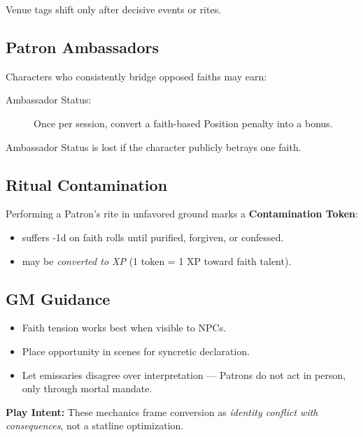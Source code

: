 \documentclass[11pt]{article}
\begin{document}
Venue tags shift only after decisive events or rites.

\subsection{Patron Ambassadors}

Characters who consistently bridge opposed faiths may earn:

\begin{description}
  \item[Ambassador Status:] Once per session, convert a faith-based
  Position penalty into a bonus.
\end{description}

Ambassador Status is lost if the character publicly betrays one faith.

\subsection{Ritual Contamination}

Performing a Patron's rite in unfavored ground marks a
\textbf{Contamination Token}:

\begin{itemize}
  \item suffers -1d on faith rolls until purified, forgiven, or confessed.
  \item may be \emph{converted to XP} (1 token = 1 XP toward faith talent).
\end{itemize}

\subsection{GM Guidance}

\begin{itemize}
  \item Faith tension works best when visible to NPCs.
  \item Place opportunity in scenes for syncretic declaration.
  \item Let emissaries disagree over interpretation --- Patrons do not
  act in person, only through mortal mandate.
\end{itemize}

\parbox{\linewidth}{
\textbf{Play Intent:} These mechanics frame conversion as
\emph{identity conflict with consequences}, not a statline optimization.
}
\end{document}

